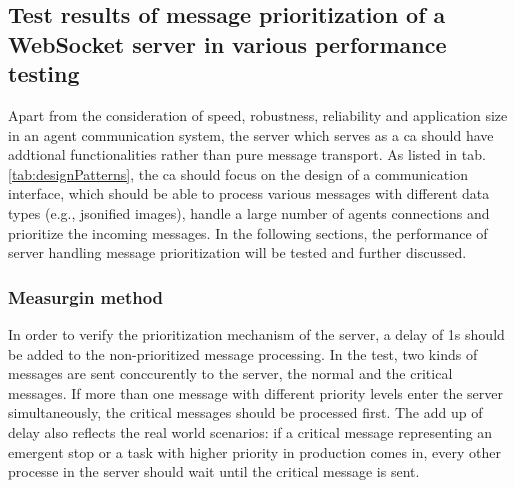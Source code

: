 \subsection{Test results of message prioritization of a WebSocket server in various 
performance testing} \label{chap: Result-priority}
Apart from the consideration of speed, robustness, reliability and application size in an agent 
communication system, the server which serves as a \gls{ca} should have addtional 
functionalities rather than pure message transport. As listed in tab.\ref{tab:designPatterns}, 
the \gls{ca} should focus on the design of a communication interface, which should be able to 
process various messages with different data types (e.g., jsonified images), handle a large 
number of agents connections and prioritize the incoming messages. In the following sections, 
the performance of server handling message prioritization will be tested and further discussed.  

\subsubsection{Measurgin method}
In order to verify the prioritization mechanism of the server, a delay of 1s should be added to the 
non-prioritized message processing. In the test, two kinds of messages are sent conccurently to the server, 
the normal and the critical messages. If more than one message with different priority levels 
enter the server simultaneously, the critical messages should be processed first. The add up of 
delay also reflects the real world scenarios: if a critical message representing an emergent stop 
or a task with higher priority in production comes in, every other processe in the server 
should wait until the critical message is sent. 

